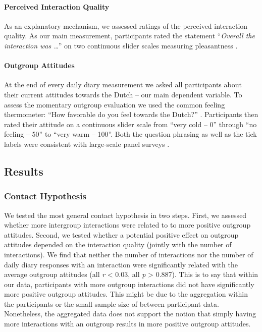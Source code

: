 \documentclass[man, 12pt, a4paper]{apa7}
\theoremstyle{break}
\theoremstyle{plain}
\begin{document}
\paragraph{Perceived Interaction Quality}

As an explanatory mechanism, we assessed ratings of the perceived
interaction quality. As our main measurement, participants rated the
statement ``\textit{Overall the interaction was …}'' on two continuous
slider scales measuring pleasantness
\citep[from unpleasant (-50) to pleasant (+50)) and meaningfulness (from superficial (-50) to meaningful (+50); both items adapted from][]{Downie2008}.

\paragraph{Outgroup Attitudes}

At the end of every daily diary measurement we asked all participants
about their current attitudes towards the Dutch -- our main dependent
variable. To assess the momentary outgroup evaluation we used the common
feeling thermometer: ``How favorable do you feel towards the Dutch?''
\citep[][]{Lavrakas2008}. Participants then rated their attitude on a
continuous slider scale from ``very cold -- 0'' through ``no feeling --
50'' to ``very warm -- 100''. Both the question phrasing as well as the
tick labels were consistent with large-scale panel surveys
\citep[e.g.,][]{DeBell2010}.

\subsection{Results}

\subsubsection{Contact Hypothesis}

We tested the most general contact hypothesis in two steps. First, we
assessed whether more intergroup interactions were related to to more
positive outgroup attitudes. Second, we tested whether a potential
positive effect on outgroup attitudes depended on the interaction
quality (jointly with the number of interactions). We find that neither
the number of interactions nor the number of daily diary responses with
an interaction were significantly related with the average outgroup
attitudes (all \textbar{} \textit{r} \textbar{} \textless{} 0.03, all
\textit{p} \textgreater{} 0.887). This is to say that within our data,
participants with more outgroup interactions did not have significantly
more positive outgroup attitudes. This might be due to the aggregation
within the participants or the small sample size of between participant
data. Nonetheless, the aggregated data does not support the notion that
simply having more interactions with an outgroup results in more
positive outgroup attitudes.
\end{document}
